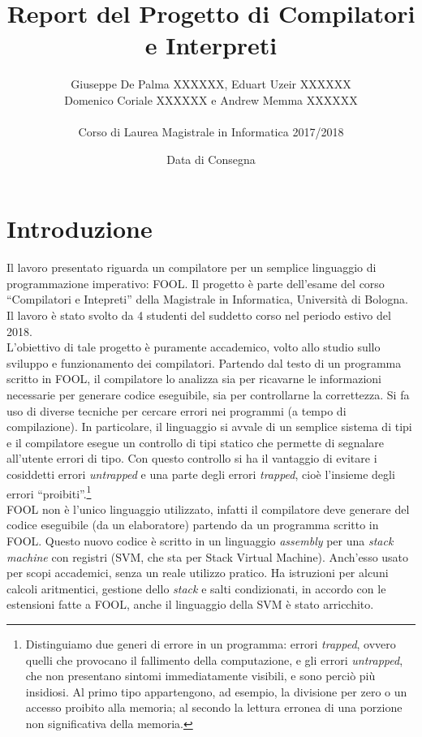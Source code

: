 \documentclass{scrreprt}
\title{Report del Progetto di Compilatori e Interpreti}
\date{Data di Consegna}
\author{Giuseppe De Palma XXXXXX, Eduart Uzeir XXXXXX\\ Domenico Coriale XXXXXX e Andrew Memma XXXXXX\\
\\Corso di Laurea Magistrale in Informatica 2017/2018}
\begin{document}
\maketitle

\tableofcontents

\chapter{Introduzione}
Il lavoro presentato riguarda un compilatore per un semplice linguaggio di programmazione imperativo: FOOL. Il progetto è parte dell'esame del corso ``Compilatori e Intepreti'' della Magistrale in Informatica, Università di Bologna. Il lavoro è stato svolto da 4 studenti del suddetto corso nel periodo estivo del 2018.\\

L'obiettivo di tale progetto è puramente accademico, volto allo studio sullo sviluppo e funzionamento dei compilatori. Partendo dal testo di un programma scritto in FOOL, il compilatore lo analizza sia per ricavarne le informazioni necessarie per generare codice eseguibile, sia per controllarne la correttezza. Si fa uso di diverse tecniche per cercare errori nei programmi (a tempo di compilazione). In particolare, il linguaggio si avvale di un semplice sistema di tipi e il compilatore esegue un controllo di tipi statico che permette di segnalare all'utente errori di tipo. Con questo controllo si ha il vantaggio di evitare i cosiddetti errori \textit{untrapped} e una parte degli errori \textit{trapped}, cioè l'insieme degli errori ``proibiti''.\footnote{Distinguiamo due generi di errore in un programma: errori \textit{trapped}, ovvero quelli che provocano il fallimento della computazione, e gli errori	\textit{untrapped}, che non	presentano sintomi immediatamente visibili, e sono perciò più insidiosi. Al primo tipo appartengono, ad esempio, la divisione per zero o un accesso proibito alla memoria; al secondo la lettura erronea di una porzione non significativa della memoria.}\\

FOOL non è l'unico linguaggio utilizzato, infatti il compilatore deve generare del codice eseguibile (da un elaboratore) partendo da un programma scritto in FOOL. Questo nuovo codice è scritto in un linguaggio \textit{assembly} per una \textit{stack machine} con registri (SVM, che sta per Stack Virtual Machine). Anch'esso usato per scopi accademici, senza un reale utilizzo pratico. Ha istruzioni per alcuni calcoli aritmentici, gestione dello \textit{stack} e salti condizionati, in accordo con le estensioni fatte a FOOL, anche il linguaggio della SVM è stato arricchito.
\end{document}

